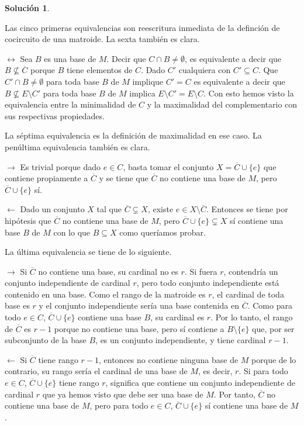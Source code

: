 \documentclass[10pt]{article}
\theoremstyle{definition}
\newtheorem*{sol}{Solución}
\begin{document}
\begin{sol}
\begin{enumerate}
Las cinco primeras equivalencias son reescritura inmediata de la definción de cocircuito de una matroide. La sexta también es clara.

$\longleftrightarrow$ Sea $B$ es una base de $M$. Decir que $C\cap B\neq \emptyset$, es equivalente a decir que $B\nsubseteq \overline{C}$ porque $B$ tiene elementos de $C$. Dado $C'$ cualquiera con $C'\subseteq C$. Que $C'\cap B\neq \emptyset$ para toda base $B$ de $M$ implique $C'=C$ es equivalente a decir que $B\nsubseteq E\setminus C'$ para toda base $B$ de $M$ implica $E\setminus C' = E\setminus C$. Con esto hemos visto la equivalencia entre la minimalidad de $C$ y la maximalidad del complementario con sus respectivas propiedades.

La séptima equivalencia es la definición de maximalidad en ese caso. La penúltima equivalencia también es clara.

$\longrightarrow$ Es trivial porque dado $e\in C$, basta tomar el conjunto $X=\overline{C}\cup\{e\}$ que contiene propiamente a $\overline{C}$ y se tiene que $\overline{C}$ no contiene una base de $M$, pero $\overline{C}\cup\{e\}$ sí.

$\longleftarrow$ Dado un conjunto $X$ tal que $\overline{C}\subsetneq X$, existe $e\in X\setminus \overline{C}$. Entonces se tiene por hipótesis que $\overline{C}$ no contiene una base de $M$, pero $\overline{C}\cup\{e\}\subsetneq X$ sí contiene una base $B$ de $M$ con lo que $B\subseteq X$ como queríamos probar.  

La última equivalencia se tiene de lo siguiente.

$\longrightarrow$ Si $\overline{C}$ no contiene una base, su cardinal no es $r$. Si fuera $r$, contendría un conjunto independiente de cardinal $r$, pero todo conjunto independiente está contenido en una base. Como el rango de la matroide es $r$, el cardinal de toda base es $r$ y el conjunto independiente sería una base contenida en $\overline{C}$. Como para todo $e\in C$, $\overline{C}\cup\{e\}$ contiene una base $B$, su cardinal es $r$. Por lo tanto, el rango de $\overline{C}$ es $r-1$ porque no contiene una base, pero sí contiene a $B\setminus \{e\}$ que, por ser subconjunto de la base $B$, es un conjunto independiente, y tiene cardinal $r-1$.

$\longleftarrow$ Si $\overline{C}$ tiene rango $r-1$, entonces no contiene ninguna base de $M$ porque de lo contrario, su rango sería el cardinal de una base de $M$, es decir, $r$. Si para todo $e\in C$, $\overline{C}\cup\{e\}$ tiene rango $r$, significa que contiene un conjunto independiente de cardinal $r$ que ya hemos visto que debe ser una base de $M$. Por tanto, $\overline{C}$ no contiene una base de $M$, pero para todo $e\in C$, $\overline{C}\cup\{e\}$ sí contiene una base de $M$.


\end{enumerate}
\end{sol}
\end{document}
